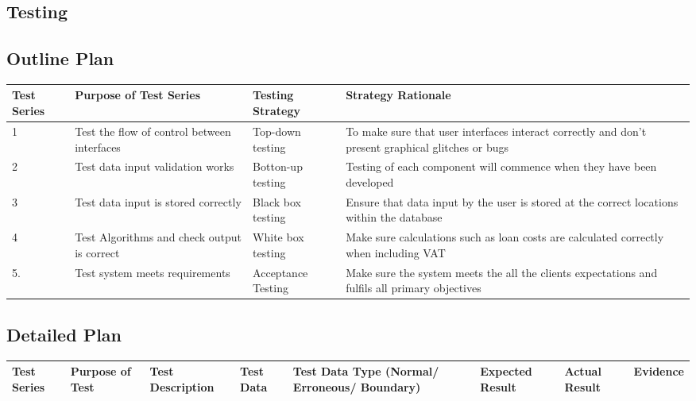 \begin{landscape}

\section{Testing}

\subsection{Outline Plan}

\begin{center}
    \begin{tabular}{|p{3cm}|p{3.5cm}|p{4cm}|p{6cm}|}
        \hline
        \textbf{Test Series} & \textbf{Purpose of Test Series} & \textbf{Testing Strategy} & \textbf{Strategy Rationale}\\ \hline
        1 & Test the flow of control between interfaces      & Top-down testing     & To make sure that user interfaces interact correctly and don't present graphical glitches or bugs\\ \hline
        2 & Test data input validation works                 & Botton-up testing    & Testing of each component will commence when they have been developed\\ \hline
        3 & Test data input is stored correctly              & Black box testing    & Ensure that data input by the user is stored at the correct locations within the database\\ \hline
        4 & Test Algorithms and check output is correct      & White box testing    & Make sure calculations such as loan costs are calculated correctly when including VAT\\ \hline
        5.& Test system meets requirements                   & Acceptance Testing   & Make sure the system meets the all the clients expectations and fulfils all primary objectives\\ \hline
    \end{tabular}
\end{center}

\newpage

\subsection{Detailed Plan}

\begin{center}
    \begin{longtable}{|p{1.5cm}|p{2cm}|p{3cm}|p{2cm}|p{2cm}|p{2.5cm}|p{2cm}|p{2cm}|}
        \hline
        \textbf{Test Series} & \textbf{Purpose of Test} & \textbf{Test Description} & \textbf{Test Data} & \textbf{Test Data Type (Normal/ Erroneous/ Boundary)} & \textbf{Expected Result} & \textbf{Actual Result} & \textbf{Evidence}\\ \hline
        

\end{longtable}
\end{center}
\end{landscape}

